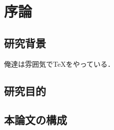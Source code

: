 \documentclass[11pt, dvipdfmx]{jreport}
\begin{document}
\chapter{序論}
\label{chap:Introduction}

\section{研究背景}

俺達は雰囲気でTeXをやっている．

\section{研究目的}

\section{本論文の構成}
\end{document}
